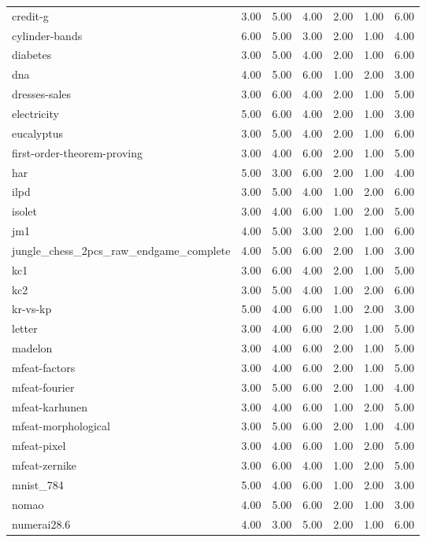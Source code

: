 \begin{table}[htbp]
\begin{tabular}{lrrrrrr}
credit-g & 3.00 & 5.00 & 4.00 & 2.00 & 1.00 & 6.00 \\
cylinder-bands & 6.00 & 5.00 & 3.00 & 2.00 & 1.00 & 4.00 \\
diabetes & 3.00 & 5.00 & 4.00 & 2.00 & 1.00 & 6.00 \\
dna & 4.00 & 5.00 & 6.00 & 1.00 & 2.00 & 3.00 \\
dresses-sales & 3.00 & 6.00 & 4.00 & 2.00 & 1.00 & 5.00 \\
electricity & 5.00 & 6.00 & 4.00 & 2.00 & 1.00 & 3.00 \\
eucalyptus & 3.00 & 5.00 & 4.00 & 2.00 & 1.00 & 6.00 \\
first-order-theorem-proving & 3.00 & 4.00 & 6.00 & 2.00 & 1.00 & 5.00 \\
har & 5.00 & 3.00 & 6.00 & 2.00 & 1.00 & 4.00 \\
ilpd & 3.00 & 5.00 & 4.00 & 1.00 & 2.00 & 6.00 \\
isolet & 3.00 & 4.00 & 6.00 & 1.00 & 2.00 & 5.00 \\
jm1 & 4.00 & 5.00 & 3.00 & 2.00 & 1.00 & 6.00 \\
jungle\_chess\_2pcs\_raw\_endgame\_complete & 4.00 & 5.00 & 6.00 & 2.00 & 1.00 & 3.00 \\
kc1 & 3.00 & 6.00 & 4.00 & 2.00 & 1.00 & 5.00 \\
kc2 & 3.00 & 5.00 & 4.00 & 1.00 & 2.00 & 6.00 \\
kr-vs-kp & 5.00 & 4.00 & 6.00 & 1.00 & 2.00 & 3.00 \\
letter & 3.00 & 4.00 & 6.00 & 2.00 & 1.00 & 5.00 \\
madelon & 3.00 & 4.00 & 6.00 & 2.00 & 1.00 & 5.00 \\
mfeat-factors & 3.00 & 4.00 & 6.00 & 2.00 & 1.00 & 5.00 \\
mfeat-fourier & 3.00 & 5.00 & 6.00 & 2.00 & 1.00 & 4.00 \\
mfeat-karhunen & 3.00 & 4.00 & 6.00 & 1.00 & 2.00 & 5.00 \\
mfeat-morphological & 3.00 & 5.00 & 6.00 & 2.00 & 1.00 & 4.00 \\
mfeat-pixel & 3.00 & 4.00 & 6.00 & 1.00 & 2.00 & 5.00 \\
mfeat-zernike & 3.00 & 6.00 & 4.00 & 1.00 & 2.00 & 5.00 \\
mnist\_784 & 5.00 & 4.00 & 6.00 & 1.00 & 2.00 & 3.00 \\
nomao & 4.00 & 5.00 & 6.00 & 2.00 & 1.00 & 3.00 \\
numerai28.6 & 4.00 & 3.00 & 5.00 & 2.00 & 1.00 & 6.00 \\

\end{tabular}
\end{table}
